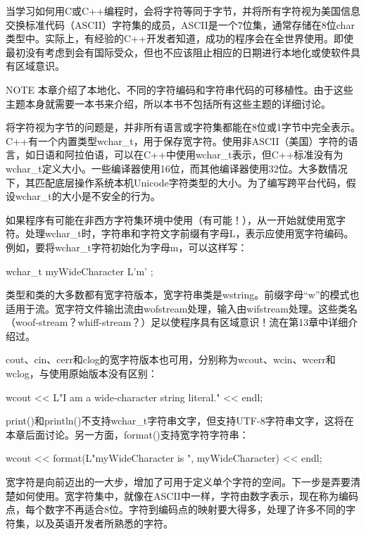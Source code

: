 
当学习如何用C或C++编程时，会将字符等同于字节，并将所有字符视为美国信息交换标准代码（ASCII）字符集的成员，ASCII是一个7位集，通常存储在8位char类型中。实际上，有经验的C++开发者知道，成功的程序会在全世界使用。即使最初没有考虑到会有国际受众，但也不应该阻止相应的日期进行本地化或使软件具有区域意识。

\begin{myNotic}{NOTE}
本章介绍了本地化、不同的字符编码和字符串代码的可移植性。由于这些主题本身就需要一本书来介绍，所以本书不包括所有这些主题的详细讨论。
\end{myNotic}


将字符视为字节的问题是，并非所有语言或字符集都能在8位或1字节中完全表示。C++有一个内置类型wchar\_t，用于保存宽字符。使用非ASCII（美国）字符的语言，如日语和阿拉伯语，可以在C++中使用wchar\_t表示，但C++标准没有为wchar\_t定义大小。一些编译器使用16位，而其他编译器使用32位。大多数情况下，其匹配底层操作系统本机Unicode字符类型的大小。为了编写跨平台代码，假设wchar\_t的大小是不安全的行为。

如果程序有可能在非西方字符集环境中使用（有可能！），从一开始就使用宽字符。处理wchar\_t时，字符串和字符文字前缀有字母L，表示应使用宽字符编码。例如，要将wchar\_t字符初始化为字母m，可以这样写：

\begin{cpp}
wchar_t myWideCharacter { L'm' };
\end{cpp}

类型和类的大多数都有宽字符版本，宽字符串类是wstring。前缀字母“w”的模式也适用于流。宽字符文件输出流由wofstream处理，输入由wifstream处理。这些类名（woof-stream？whiff-stream？）足以使程序具有区域意识！流在第13章中详细介绍过。

cout、cin、cerr和clog的宽字符版本也可用，分别称为wcout、wcin、wcerr和wclog，与使用原始版本没有区别：

\begin{cpp}
wcout << L"I am a wide-character string literal." << endl;
\end{cpp}

print()和println()不支持wchar\_t字符串文字，但支持UTF-8字符串文字，这将在本章后面讨论。另一方面，format()支持宽字符字符串：

\begin{cpp}
wcout << format(L"myWideCharacter is {}", myWideCharacter) << endl;
\end{cpp}


宽字符是向前迈出的一大步，增加了可用于定义单个字符的空间。下一步是弄要清楚如何使用。宽字符集中，就像在ASCII中一样，字符由数字表示，现在称为编码点，每个数字不再适合8位。字符到编码点的映射要大得多，处理了许多不同的字符集，以及英语开发者所熟悉的字符。

